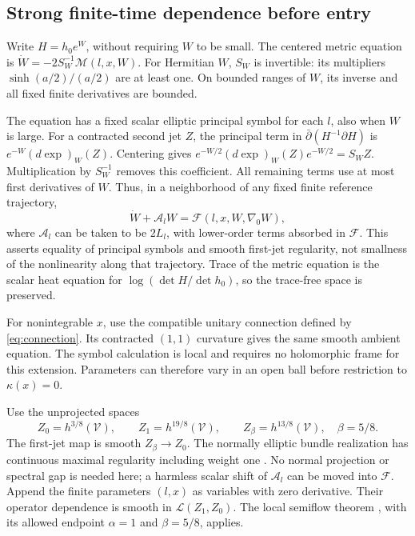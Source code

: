 \documentclass[11pt]{amsart}
\theoremstyle{definition}
\theoremstyle{remark}
\begin{document}
\subsection{Strong finite-time dependence before entry}
Write $H=h_0e^W$, without requiring $W$ to be small.
The centered metric equation is
$\dot W=-2S_W^{-1}\mathcal M(l,x,W)$.
For Hermitian $W$, $S_W$ is invertible: its multipliers
$\sinh(a/2)/(a/2)$ are at least one. On bounded ranges of $W$,
its inverse and all fixed finite derivatives are bounded.

The equation has a fixed scalar elliptic principal symbol for
each $l$, also when $W$ is large. For a contracted second jet $Z$,
the principal term in $\bar\partial(H^{-1}\partial H)$ is
$e^{-W}(d\exp)_W(Z)$. Centering gives
$e^{-W/2}(d\exp)_W(Z)e^{-W/2}=S_WZ$.
Multiplication by $S_W^{-1}$ removes this coefficient.
All remaining terms use at most first derivatives of $W$.
Thus, in a neighborhood of any fixed finite reference trajectory,
\begin{equation}\label{eq:unsliced-equation}
 \dot W+\mathcal A_lW
       =\mathcal F(l,x,W,\nabla_0W),
\end{equation}
where $\mathcal A_l$ can be taken to be $2L_l$, with lower-order
terms absorbed in $\mathcal F$. This asserts equality of principal
symbols and smooth first-jet regularity, not smallness of the
nonlinearity along that trajectory. Trace of the metric equation
is the scalar heat equation for $\log(\det H/\det h_0)$,
so the trace-free space is preserved.

For nonintegrable $x$, use the compatible unitary connection
defined by \eqref{eq:connection}. Its contracted $(1,1)$ curvature
gives the same smooth ambient equation. The symbol calculation
is local and requires no holomorphic frame for this extension.
Parameters can therefore vary in an open ball before restriction
to $\kappa(x)=0$.

Use the unprojected spaces
\[
 Z_0=h^{3/8}(\mathcal V),\qquad Z_1=h^{19/8}(\mathcal V),
       \qquad Z_\beta=h^{13/8}(\mathcal V),\quad\beta=5/8.
\]
The first-jet map is smooth $Z_\beta\to Z_0$.
The normally elliptic bundle realization has continuous maximal
regularity including weight one
\cite[Theorem 3.6 and Proposition 3.7]{ShaoSimonett14}.
No normal projection or spectral gap is needed here; a harmless
scalar shift of $\mathcal A_l$ can be moved into $\mathcal F$.
Append the finite parameters $(l,x)$ as variables with zero
derivative. Their operator dependence is smooth in
$\mathcal L(Z_1,Z_0)$. The local semiflow theorem
\cite[Theorem 3.1]{Simonett95}, with its allowed endpoint
$\alpha=1$ and $\beta=5/8$, applies.
\end{document}

